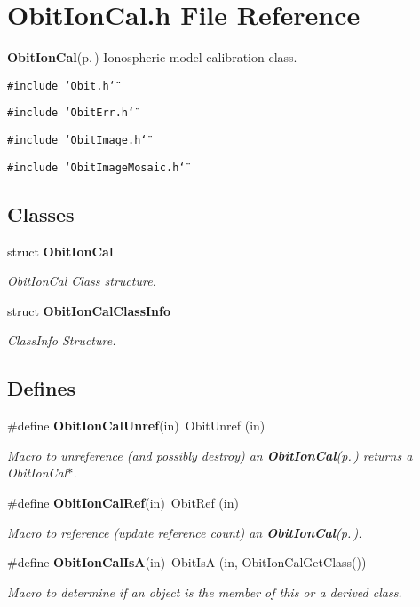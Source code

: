 \section{Obit\-Ion\-Cal.h File Reference}
\label{ObitIonCal_8h}
{\bf Obit\-Ion\-Cal}{\rm (p.\,\pageref{structObitIonCal})} Ionospheric model calibration class. 

{\tt \#include \char`\"{}Obit.h\char`\"{}}\par
{\tt \#include \char`\"{}Obit\-Err.h\char`\"{}}\par
{\tt \#include \char`\"{}Obit\-Image.h\char`\"{}}\par
{\tt \#include \char`\"{}Obit\-Image\-Mosaic.h\char`\"{}}\par
\subsection*{Classes}
\begin{CompactItemize}
\item 
struct {\bf Obit\-Ion\-Cal}
\begin{CompactList}\small\item\em Obit\-Ion\-Cal Class structure. \item\end{CompactList}\item 
struct {\bf Obit\-Ion\-Cal\-Class\-Info}
\begin{CompactList}\small\item\em Class\-Info Structure. \item\end{CompactList}\end{CompactItemize}
\subsection*{Defines}
\begin{CompactItemize}
\item 
\#define {\bf Obit\-Ion\-Cal\-Unref}(in)\ Obit\-Unref (in)
\begin{CompactList}\small\item\em Macro to unreference (and possibly destroy) an {\bf Obit\-Ion\-Cal}{\rm (p.\,\pageref{structObitIonCal})} returns a Obit\-Ion\-Cal$\ast$. \item\end{CompactList}\item 
\#define {\bf Obit\-Ion\-Cal\-Ref}(in)\ Obit\-Ref (in)
\begin{CompactList}\small\item\em Macro to reference (update reference count) an {\bf Obit\-Ion\-Cal}{\rm (p.\,\pageref{structObitIonCal})}. \item\end{CompactList}\item 
\#define {\bf Obit\-Ion\-Cal\-Is\-A}(in)\ Obit\-Is\-A (in, Obit\-Ion\-Cal\-Get\-Class())
\begin{CompactList}\small\item\em Macro to determine if an object is the member of this or a derived class. \item\end{CompactList}\end{CompactItemize}
